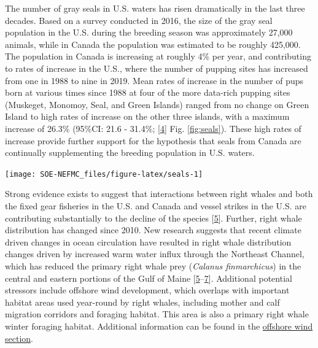 \documentclass[
  10pt,
]{article}
\let\origfigure\figure
\let\endorigfigure\endfigure
\renewenvironment{figure}[1][2] {
    \expandafter\origfigure\expandafter[H]
} {
    \endorigfigure
}
\begin{document}
The number of gray seals in U.S. waters has risen dramatically in the last three decades. Based on a survey conducted in 2016, the size of the gray seal population in the U.S. during the breeding season was approximately 27,000 animals, while in Canada the population was estimated to be roughly 425,000. The population in Canada is increasing at roughly 4\% per year, and contributing to rates of increase in the U.S., where the number of pupping sites has increased from one in 1988 to nine in 2019. Mean rates of increase in the number of pups born at various times since 1988 at four of the more data-rich pupping sites (Muskeget, Monomoy, Seal, and Green Islands) ranged from no change on Green Island to high rates of increase on the other three islands, with a maximum increase of 26.3\% (95\%CI: 21.6 - 31.4\%; {[}\protect\hyperlink{ref-wood_rates_2020}{4}{]} Fig. \ref{fig:seals}). These high rates of increase provide further support for the hypothesis that seals from Canada are continually supplementing the breeding population in U.S. waters.

\begin{figure}

{\centering \texttt{[image: SOE-NEFMC\_files/figure-latex/seals-1]} 

}

\caption{Estimated mean rates of increase in the number of gray seal pups born at four United States pupping colonies at various times from 1988 to 2021. Recreated from Wood et al. 2022 (Figure 5).}\label{fig:seals}
\end{figure}

Strong evidence exists to suggest that interactions between right whales and both the fixed gear fisheries in the U.S. and Canada and vessel strikes in the U.S. are contributing substantially to the decline of the species {[}\protect\hyperlink{ref-hayes_north_2018}{5}{]}. Further, right whale distribution has changed since 2010. New research suggests that recent climate driven changes in ocean circulation have resulted in right whale distribution changes driven by increased warm water influx through the Northeast Channel, which has reduced the primary right whale prey (\emph{Calanus finmarchicus}) in the central and eastern portions of the Gulf of Maine {[}\protect\hyperlink{ref-hayes_north_2018}{5}--\protect\hyperlink{ref-sorochan_north_2019}{7}{]}. Additional potential stressors include offshore wind development, which overlaps with important habitat areas used year-round by right whales, including mother and calf migration corridors and foraging habitat. This area is also a primary right whale winter foraging habitat. Additional information can be found in the \protect\hyperlink{other-ocean-uses:-offshore-wind}{offshore wind section}.
\end{document}
